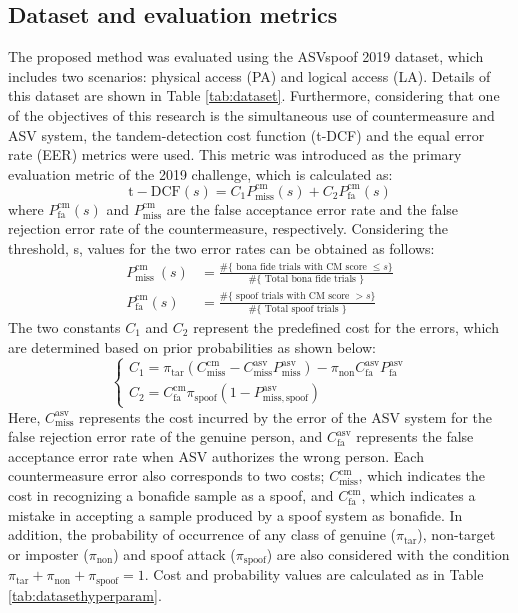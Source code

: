 \documentclass[a4paper]{article}
\begin{document}
\subsection{Dataset and evaluation metrics}
The proposed method was evaluated using the ASVspoof 2019 dataset, which includes two scenarios: physical access (PA) and logical access (LA). Details of this dataset are shown in Table \ref{tab:dataset}. Furthermore, considering that one of the objectives of this research is the simultaneous use of countermeasure and ASV system, the tandem-detection cost function (t-DCF) and the equal error rate (EER) metrics were used. This metric was introduced as the primary evaluation metric of the 2019 challenge, which is calculated as:
$$
\mathrm{t}-\mathrm{DCF}(s)=C_{1} P_{\mathrm{miss}}^{\mathrm{cm}}(s)+C_{2} P_{\mathrm{fa}}^{\mathrm{cm}}(s)
$$
where
$P_{\mathrm{fa}}^{\mathrm{cm}}(s)$ 
and
$P_{\mathrm{miss}}^{\mathrm{cm}}$ 
are the false acceptance error rate and the false rejection error rate of the countermeasure, respectively. Considering the threshold, s, values for the two error rates can be obtained as follows:
$$
\begin{aligned}
P_{\text {miss }}^{\mathrm{cm}}(s) &=\frac{\#\{\text { bona fide trials with CM score } \leq s\}}{\#\{\text { Total bona fide trials }\}} \\
P_{\mathrm{fa}}^{\mathrm{cm}}(s) &=\frac{\#\{\text { spoof trials with CM score }>s\}}{\#\{\text { Total spoof trials }\}}
\end{aligned}
$$
The two constants $C_1$ and $C_2$ represent the predefined cost for the errors, which are determined based on prior probabilities as shown below:
$$
\left\{\begin{array}{l}
C_{1}=\pi_{\operatorname{tar}}\left(C_{\mathrm{miss}}^{\mathrm{cm}}-C_{\mathrm{miss}}^{\mathrm{asv}} P_{\mathrm{miss}}^{\mathrm{asv}}\right)-\pi_{\mathrm{non}} C_{\mathrm{fa}}^{\mathrm{asv}} P_{\mathrm{fa}}^{\mathrm{asv}} \\
C_{2}=C_{\mathrm{fa}}^{\mathrm{cm}} \pi_{\mathrm{spoof}}\left(1-P_{\mathrm{miss}, \mathrm{spoof}}^{\mathrm{asv}}\right)
\end{array}\right.
$$
Here, $C_{\mathrm{miss}}^{\mathrm{asv}}$ represents the cost incurred by the error of the ASV system for the false rejection error rate of the genuine person, and $C_{\mathrm{fa}}^{\mathrm{asv}}$ represents the false acceptance error rate when ASV authorizes the wrong person. Each countermeasure error also corresponds to two costs; $C_{\mathrm{miss}}^{\mathrm{cm}}$, which indicates the cost in recognizing a bonafide sample as a spoof, and $C_{\mathrm{fa}}^{\mathrm{cm}}$, which indicates a mistake in accepting a sample produced by a spoof system as bonafide. In addition, the probability of occurrence of any class of genuine ($\pi_{\mathrm{tar}}$), non-target or imposter ($\pi_{\mathrm{non}}$) and spoof attack ($\pi_{\mathrm{spoof}}$) are also considered with the condition $\pi_{\mathrm{tar}}+\pi_{\mathrm{non}}+\pi_{\mathrm{spoof}}=1$. Cost and probability values are calculated as in Table \ref{tab:datasethyperparam}.
\end{document}
